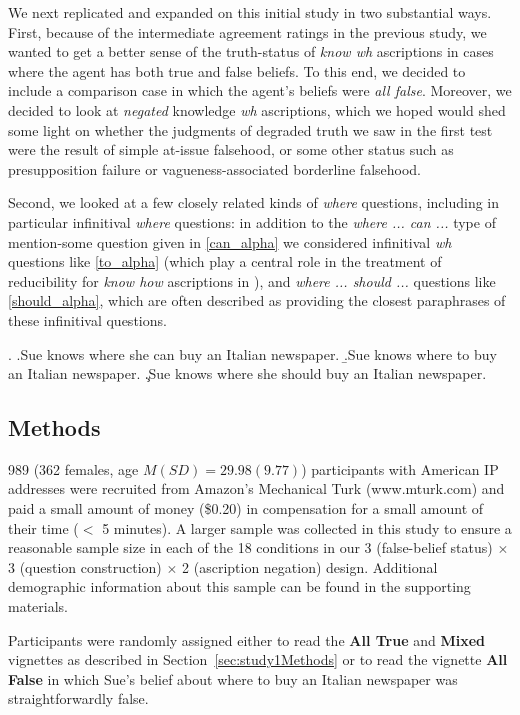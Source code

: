 \documentclass[a4paper]{article}
\begin{document}
We next replicated and expanded on this initial study in two substantial ways. First, because of the intermediate agreement ratings in the previous study, we wanted to get a better sense of the truth-status of \textit{know wh} ascriptions in cases where the agent has both true and false beliefs. To this end, we decided to include a comparison case in which the agent's beliefs were \textit{all false}. Moreover, we decided to look at \textit{negated} knowledge \textit{wh} ascriptions, which we hoped would shed some light on whether the judgments of degraded truth we saw in the first test were the result of simple at-issue falsehood, or some other status such as presupposition failure or vagueness-associated borderline falsehood.

Second, we looked at a few closely related kinds of \textit{where} questions, including in particular infinitival \textit{where} questions: in addition to the \textit{where ... can ...} type of mention-some question given in \ref{can_alpha} we considered infinitival \textit{wh} questions like \ref{to_alpha} (which play a central role in the treatment of reducibility for \textit{know how} ascriptions in \cite{stanley:knowhow}), and \textit{where ... should ...} questions like \ref{should_alpha}, which are often described as providing the closest paraphrases of these infinitival questions.

\ex. \a.\label{can_alpha}Sue knows where she can buy an Italian newspaper.
\b.\label{to_alpha}Sue knows where to buy an Italian newspaper.
\c.\label{should_alpha}Sue knows where she should buy an Italian newspaper.


\subsection{Methods}

989 (362 females, age $M(SD) = 29.98(9.77)$) participants with American IP addresses were recruited from Amazon's Mechanical Turk (www.mturk.com) and paid a small amount of money (\$0.20) in compensation for a small amount of their time ($<$ 5 minutes). A larger sample was collected in this study to ensure a reasonable sample size in each of the 18 conditions in our 3 (false-belief status) $\times$ 3 (question construction) $\times$ 2 (ascription negation) design. Additional demographic information about this sample can be found in the supporting materials.

Participants were randomly assigned either to read the \textbf{All True} and \textbf{Mixed} vignettes as described in Section~\ref{sec:study1Methods} or to read the vignette \textbf{All False} in which Sue's belief about where to buy an Italian newspaper was straightforwardly false.
\end{document}
